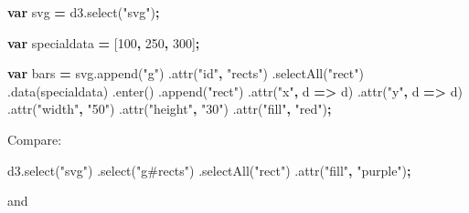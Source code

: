 \documentclass[openany]{book}
\newenvironment{Shaded}{\begin{snugshade}}{\end{snugshade}}
\newcommand{\AttributeTok}[1]{\textcolor[rgb]{0.77,0.63,0.00}{#1}}
\newcommand{\DecValTok}[1]{\textcolor[rgb]{0.00,0.00,0.81}{#1}}
\newcommand{\KeywordTok}[1]{\textcolor[rgb]{0.13,0.29,0.53}{\textbf{#1}}}
\newcommand{\NormalTok}[1]{#1}
\newcommand{\OperatorTok}[1]{\textcolor[rgb]{0.81,0.36,0.00}{\textbf{#1}}}
\newcommand{\StringTok}[1]{\textcolor[rgb]{0.31,0.60,0.02}{#1}}
\newcommand{\VariableTok}[1]{\textcolor[rgb]{0.00,0.00,0.00}{#1}}
\begin{document}
\begin{Shaded}
\begin{Highlighting}[]
\KeywordTok{var}\NormalTok{ svg }\OperatorTok{=} \VariableTok{d3}\NormalTok{.}\AttributeTok{select}\NormalTok{(}\StringTok{"svg"}\NormalTok{)}\OperatorTok{;}

\KeywordTok{var}\NormalTok{ specialdata }\OperatorTok{=}\NormalTok{ [}\DecValTok{100}\OperatorTok{,} \DecValTok{250}\OperatorTok{,} \DecValTok{300}\NormalTok{]}\OperatorTok{;}

\KeywordTok{var}\NormalTok{ bars }\OperatorTok{=} \VariableTok{svg}\NormalTok{.}\AttributeTok{append}\NormalTok{(}\StringTok{"g"}\NormalTok{)}
\NormalTok{      .}\AttributeTok{attr}\NormalTok{(}\StringTok{"id"}\OperatorTok{,} \StringTok{"rects"}\NormalTok{)}
\NormalTok{      .}\AttributeTok{selectAll}\NormalTok{(}\StringTok{"rect"}\NormalTok{)}
\NormalTok{      .}\AttributeTok{data}\NormalTok{(specialdata)}
\NormalTok{      .}\AttributeTok{enter}\NormalTok{()}
\NormalTok{      .}\AttributeTok{append}\NormalTok{(}\StringTok{"rect"}\NormalTok{)}
\NormalTok{        .}\AttributeTok{attr}\NormalTok{(}\StringTok{"x"}\OperatorTok{,}\NormalTok{ d }\OperatorTok{=>}\NormalTok{ d)}
\NormalTok{        .}\AttributeTok{attr}\NormalTok{(}\StringTok{"y"}\OperatorTok{,}\NormalTok{ d }\OperatorTok{=>}\NormalTok{ d)}
\NormalTok{        .}\AttributeTok{attr}\NormalTok{(}\StringTok{"width"}\OperatorTok{,} \StringTok{"50"}\NormalTok{)}
\NormalTok{        .}\AttributeTok{attr}\NormalTok{(}\StringTok{"height"}\OperatorTok{,} \StringTok{"30"}\NormalTok{)}
\NormalTok{        .}\AttributeTok{attr}\NormalTok{(}\StringTok{"fill"}\OperatorTok{,} \StringTok{"red"}\NormalTok{)}\OperatorTok{;}
\end{Highlighting}
\end{Shaded}

Compare:

\begin{Shaded}
\begin{Highlighting}[]
\VariableTok{d3}\NormalTok{.}\AttributeTok{select}\NormalTok{(}\StringTok{"svg"}\NormalTok{)}
\NormalTok{  .}\AttributeTok{select}\NormalTok{(}\StringTok{"g#rects"}\NormalTok{)}
\NormalTok{  .}\AttributeTok{selectAll}\NormalTok{(}\StringTok{"rect"}\NormalTok{)}
\NormalTok{  .}\AttributeTok{attr}\NormalTok{(}\StringTok{"fill"}\OperatorTok{,} \StringTok{"purple"}\NormalTok{)}\OperatorTok{;}
\end{Highlighting}
\end{Shaded}

and
\end{document}
